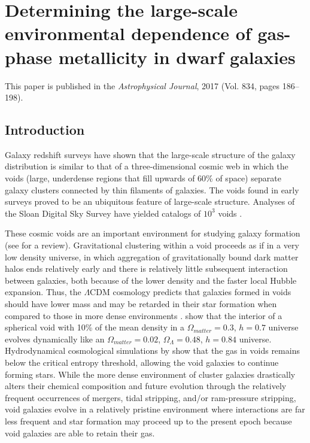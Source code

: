 \chapter[Metallicity of dwarf galaxies]{Determining the large-scale environmental dependence of gas-phase metallicity in dwarf galaxies}

This paper is published in the \emph{Astrophysical Journal}, 2017 (Vol. 834, 
pages 186--198).


\section{Introduction}


Galaxy redshift surveys have shown that the large-scale structure of the galaxy 
distribution is similar to that of a three-dimensional cosmic web \citep{Bond96} 
in which the voids (large, underdense regions that fill upwards of 60\% of 
space) separate galaxy clusters connected by thin filaments of galaxies.  The 
voids found in early surveys \citep[e.g.,][]{Gregory78, Kirshner81, 
deLapparent86} proved to be an ubiquitous feature of large-scale structure.  
Analyses of the Sloan Digital Sky Survey \citep{Abazajian09, Ahn12} have yielded 
catalogs of $10^3$ voids \citep{Pan12, Sutter14}.


These cosmic voids are an important environment for studying galaxy formation 
(see \cite{vandeWeygaert11} for a review).  Gravitational clustering within a 
void proceeds as if in a very low density universe, in which aggregation of 
gravitationally bound dark matter halos ends relatively early and there is 
relatively little subsequent interaction between galaxies, both because of the 
lower density and the faster local Hubble expansion.  Thus, the $\Lambda$CDM 
cosmology predicts that galaxies formed in voids should have lower mass and may 
be retarded in their star formation when compared to those in more dense 
environments \citep[e.g.,][]{Gottlober03, Goldberg05, Cen11}.  \cite{Goldberg04} 
show that the interior of a spherical void with 10\% of the mean density in a 
$\Omega_{matter} = 0.3$, $h = 0.7$ universe evolves dynamically like an 
$\Omega_{matter} = 0.02$, $\Omega_{\Lambda} = 0.48$, $h = 0.84$ universe.  
Hydrodynamical cosmological simulations by \cite{Cen11} show that the gas in 
voids remains below the critical entropy threshold, allowing the void galaxies 
to continue forming stars.  While the more dense environment of cluster galaxies 
drastically alters their chemical composition and future evolution through the 
relatively frequent occurrences of mergers, tidal stripping, and/or ram-pressure 
stripping, void galaxies evolve in a relatively pristine environment where 
interactions are far less frequent and star formation may proceed up to the 
present epoch because void galaxies are able to retain their gas.

